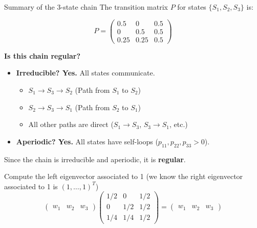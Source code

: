 \documentclass[aspectratio=169]{beamer}\usepackage[]{graphicx}\usepackage[]{xcolor}
\begin{document}
\begin{frame}{Summary of the 3-state chain}
    The transition matrix $P$ for states $\{S_1, S_2, S_3\}$ is:
    
    $$
    P = 
    \begin{pmatrix}
    0.5 & 0 & 0.5 \\
    0 & 0.5 & 0.5 \\
    0.25 & 0.25 & 0.5
    \end{pmatrix}
    $$
    
    \vfill
    
    \textbf{Is this chain regular?}
    \begin{itemize}
        \item \textbf{Irreducible? Yes.} All states communicate.
            \begin{itemize}
                \item $S_1 \to S_3 \to S_2$ (Path from $S_1$ to $S_2$)
                \item $S_2 \to S_3 \to S_1$ (Path from $S_2$ to $S_1$)
                \item All other paths are direct ($S_1 \to S_3$, $S_3 \to S_1$, etc.)
            \end{itemize}
        \item \textbf{Aperiodic? Yes.} All states have self-loops ($p_{11}, p_{22}, p_{33} > 0$).
    \end{itemize}
    \vfill
    Since the chain is irreducible and aperiodic, it is \textbf{regular}.
\end{frame}



\begin{frame}
Compute the left eigenvector associated to 1 (we know the right eigenvector associated to 1 is $(1,\ldots,1)^T$)
\[
\begin{pmatrix}
	w_1 & w_2 & w_3
\end{pmatrix}
\begin{pmatrix}
	1/2 & 0 & 1/2 \\
	0 & 1/2 & 1/2 \\
	1/4 & 1/4 & 1/2
\end{pmatrix}
=
\begin{pmatrix}
	w_1 & w_2 & w_3
\end{pmatrix}
\]
\end{frame}
\end{document}
